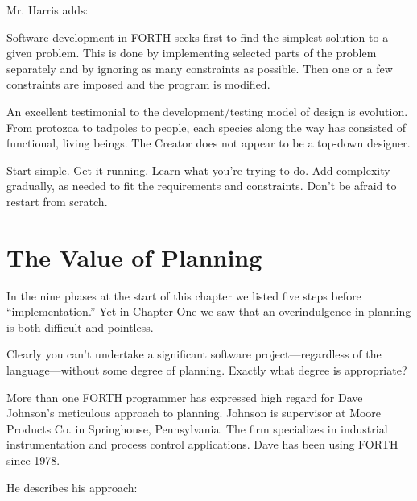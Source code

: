 
\noindent Mr. Harris adds:

\begin{tfquot}
\noindent Software development in FORTH seeks first to find the simplest solution
to a given problem. This is done by implementing selected parts of the
problem separately and by ignoring as many constraints as possible. Then one
or a few constraints are imposed and the program is modified.
\end{tfquot}

\noindent An excellent testimonial to the development/testing model of design is
evolution. From protozoa to tadpoles to people, each species along the
way has consisted of functional, living beings. The Creator does not
appear to be a top-down designer.

\begin{tip}
Start simple. Get it running. Learn what you're trying to do. Add
complexity gradually, as needed to fit the requirements and constraints. Don't be
afraid to restart from scratch.
\end{tip}

\section{The Value of Planning}

\noindent In the nine phases at the start of this chapter we listed five steps before
``implementation.'' Yet in Chapter One we saw that an overindulgence in
planning is both difficult and pointless.

Clearly you can't undertake a significant software
project---regardless of the language---without some degree of planning.
Exactly what degree is appropriate?

\bigskip\blackline{2ex}
More than one FORTH programmer has expressed high regard for Dave
Johnson's meticulous approach to planning. Johnson is supervisor at
Moore Products Co. in Springhouse, Pennsylvania. The firm specializes
in industrial instrumentation and process control applications. Dave has
been using FORTH since 1978.

He describes his approach:

